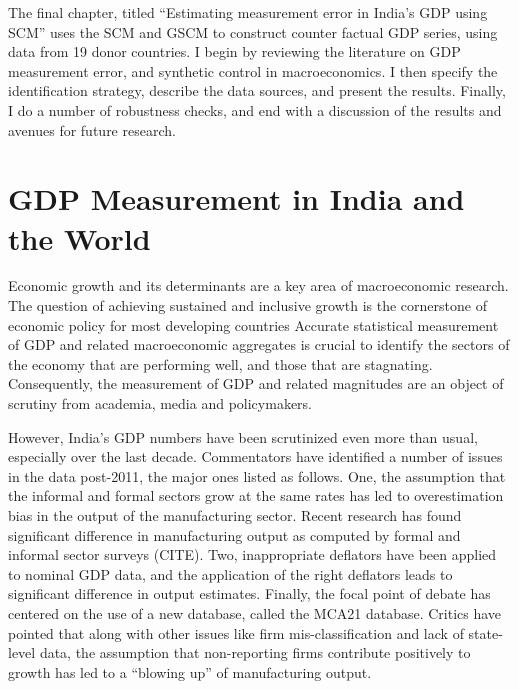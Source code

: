 \documentclass[12pt,nobind, a4paper]{reedthesis}
\begin{document}
 The final chapter, titled ``Estimating measurement error in India's GDP using SCM'' uses the SCM and GSCM to construct counter factual GDP series, using data from 19 donor countries. I begin by reviewing the literature on GDP measurement error, and synthetic control in macroeconomics. I then specify the identification strategy, describe the data sources, and present the results. Finally, I do a number of robustness checks, and end with a discussion of the results and avenues for future research.

 \hypertarget{gdp-measurement-in-india-and-the-world}{%
 \chapter{GDP Measurement in India and the World}\label{gdp-measurement-in-india-and-the-world}}

 Economic growth and its determinants are a key area of macroeconomic research. The question of achieving sustained and inclusive growth is the cornerstone of economic policy for most developing countries Accurate statistical measurement of GDP and related macroeconomic aggregates is crucial to identify the sectors of the economy that are performing well, and those that are stagnating. Consequently, the measurement of GDP and related magnitudes are an object of scrutiny from academia, media and policymakers.
 \linebreak

 However, India's GDP numbers have been scrutinized even more than usual, especially over the last decade. Commentators have identified a number of issues in the data post-2011, the major ones listed as follows. One, the assumption that the informal and formal sectors grow at the same rates has led to overestimation bias in the output of the manufacturing sector. Recent research has found significant difference in manufacturing output as computed by formal and informal sector surveys (CITE). Two, inappropriate deflators have been applied to nominal GDP data, and the application of the right deflators leads to significant difference in output estimates. Finally, the focal point of debate has centered on the use of a new database, called the MCA21 database. Critics have pointed that along with other issues like firm mis-classification and lack of state-level data, the assumption that non-reporting firms contribute positively to growth has led to a ``blowing up'' of manufacturing output.
 \linebreak
\end{document}
